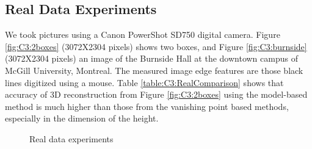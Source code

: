\subsection{Real Data Experiments}

We took pictures using a Canon PowerShot SD750 digital camera. Figure \ref{fig:C3:2boxes} (3072X2304 pixels) shows two boxes, and Figure \ref{fig:C3:burnside} (3072X2304 pixels) an image of the Burnside Hall at the downtown campus of McGill University, Montreal. The measured image edge features are those black lines digitized using a mouse. Table \ref {table:C3:RealComparison} shows that accuracy of 3D reconstruction from Figure \ref{fig:C3:2boxes}  using the model-based method is much higher than those from the vanishing point based methods, especially in the dimension of the height.

\begin{figure}[H]
\centering
{} 
\hspace{.1in}
\caption{Real data experiments}
\label{fig:C3:RealData}
\end{figure}

%

